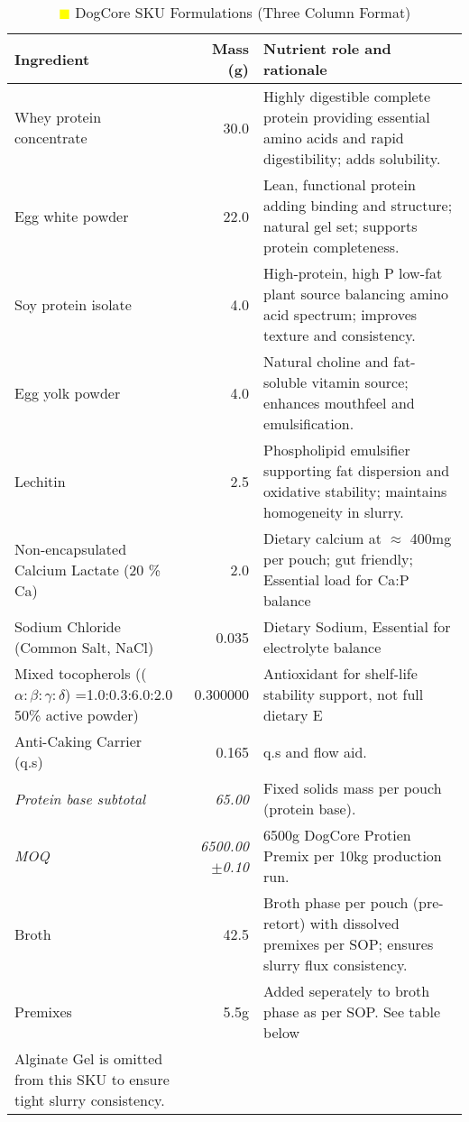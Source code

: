 \begin{table}[h]
\centering
\caption{\textcolor{yellow}{$\blacksquare$} DogCore SKU Formulations (Three Column Format)}
\label{tab:dogcore_sku_3col}
\begin{tabular}{@{}l r p{8.0cm}@{}}
\toprule
\textbf{Ingredient} & \textbf{Mass (g)} & \textbf{Nutrient role and rationale} \\
\midrule
Whey protein concentrate & 30.0 & Highly digestible complete protein providing essential amino acids and rapid digestibility; adds solubility. \\[3pt]
Egg white powder & 22.0 & Lean, functional protein adding binding and structure; natural gel set; supports protein completeness. \\[3pt]
Soy protein isolate & 4.0 & High-protein, high P low-fat plant source balancing amino acid spectrum; improves texture and consistency. \\[3pt]
Egg yolk powder & 4.0 & Natural choline and fat-soluble vitamin source; enhances mouthfeel and emulsification. \\[3pt]
Lechitin & 2.5 & Phospholipid emulsifier supporting fat dispersion and oxidative stability; maintains homogeneity in slurry. \\[3pt]
Non-encapsulated Calcium Lactate (20 \% Ca) & 2.0 & Dietary calcium at $\approx$ 400mg per pouch; gut friendly; Essential load for Ca:P balance \\[3pt]
Sodium Chloride (Common Salt, NaCl) & 0.035 & Dietary Sodium, Essential for electrolyte balance \\[3pt]
\midrule
Mixed tocopherols (($\alpha:\beta:\gamma:\delta$) =1.0:0.3:6.0:2.0 50\% active powder) & 0.300000  & Antioxidant for shelf-life stability support, not full dietary E \\[2pt]
Anti-Caking Carrier (q.s) & 0.165 & q.s and flow aid. \\[3pt]
\midrule
\textit{Protein base subtotal} & \textit{65.00} & Fixed solids mass per pouch (protein base). \\[3pt]
\textit {MOQ} &\textit{6500.00 $\pm$0.10} & 6500g DogCore Protien Premix per 10kg production run. \\[3pt]
Broth & 42.5 & Broth phase per pouch (pre-retort) with dissolved premixes per SOP; ensures slurry flux consistency. \\[3pt]
Premixes & 5.5g & Added seperately to broth phase as per SOP. See table below \\[3pt]
Alginate Gel is omitted from this SKU to ensure tight slurry consistency. \\[3pt]
\bottomrule
\end{tabular}
\end{table}


